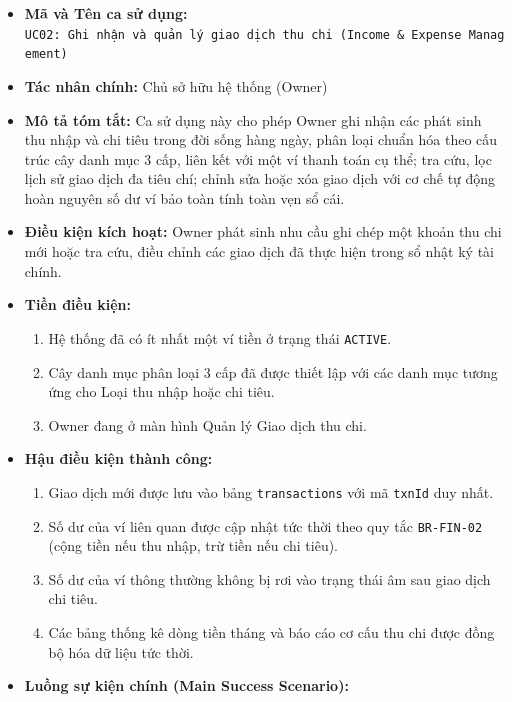 \documentclass[11pt,a4paper]{article}
\providecommand{\tightlist}{
  \setlength{\itemsep}{0pt}\setlength{\parskip}{0pt}}
\begin{document}
\begin{itemize}
\tightlist
\item
  \textbf{Mã và Tên ca sử dụng:}
  \texttt{UC02:\ Ghi\ nhận\ và\ quản\ lý\ giao\ dịch\ thu\ chi\ (Income\ \&\ Expense\ Management)}
\item
  \textbf{Tác nhân chính:} Chủ sở hữu hệ thống (Owner)
\item
  \textbf{Mô tả tóm tắt:} Ca sử dụng này cho phép Owner ghi nhận các
  phát sinh thu nhập và chi tiêu trong đời sống hàng ngày, phân loại
  chuẩn hóa theo cấu trúc cây danh mục 3 cấp, liên kết với một ví thanh
  toán cụ thể; tra cứu, lọc lịch sử giao dịch đa tiêu chí; chỉnh sửa
  hoặc xóa giao dịch với cơ chế tự động hoàn nguyên số dư ví bảo toàn
  tính toàn vẹn sổ cái.
\item
  \textbf{Điều kiện kích hoạt:} Owner phát sinh nhu cầu ghi chép một
  khoản thu chi mới hoặc tra cứu, điều chỉnh các giao dịch đã thực hiện
  trong sổ nhật ký tài chính.
\item
  \textbf{Tiền điều kiện:}

  \begin{enumerate}
  \def\labelenumi{\arabic{enumi}.}
  \tightlist
  \item
    Hệ thống đã có ít nhất một ví tiền ở trạng thái \texttt{ACTIVE}.
  \item
    Cây danh mục phân loại 3 cấp đã được thiết lập với các danh mục
    tương ứng cho Loại thu nhập hoặc chi tiêu.
  \item
    Owner đang ở màn hình Quản lý Giao dịch thu chi.
  \end{enumerate}
\item
  \textbf{Hậu điều kiện thành công:}

  \begin{enumerate}
  \def\labelenumi{\arabic{enumi}.}
  \tightlist
  \item
    Giao dịch mới được lưu vào bảng \texttt{transactions} với mã
    \texttt{txnId} duy nhất.
  \item
    Số dư của ví liên quan được cập nhật tức thời theo quy tắc
    \texttt{BR-FIN-02} (cộng tiền nếu thu nhập, trừ tiền nếu chi tiêu).
  \item
    Số dư của ví thông thường không bị rơi vào trạng thái âm sau giao
    dịch chi tiêu.
  \item
    Các bảng thống kê dòng tiền tháng và báo cáo cơ cấu thu chi được
    đồng bộ hóa dữ liệu tức thời.
  \end{enumerate}
\item
  \textbf{Luồng sự kiện chính (Main Success Scenario):}


\end{itemize}
\end{document}
